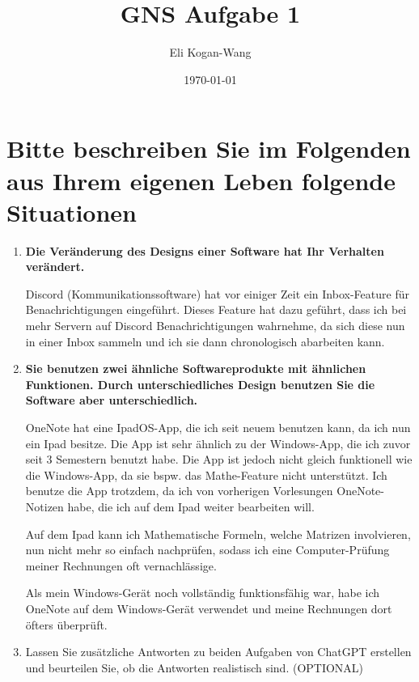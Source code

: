 \documentclass[a4paper,12pt]{article}
\title{GNS Aufgabe 1}
\author{Eli Kogan-Wang}
\date{\today}
\begin{document}

\section{Bitte beschreiben Sie im Folgenden aus Ihrem eigenen Leben folgende Situationen}
\begin{enumerate}[label=\alph*)]
  \item \textbf{Die Veränderung des Designs einer Software hat Ihr Verhalten verändert.}

        Discord (Kommunikationssoftware) hat vor einiger Zeit ein Inbox-Feature für
        Benachrichtigungen eingeführt. Dieses Feature hat dazu geführt, dass ich
        bei mehr Servern auf Discord Benachrichtigungen wahrnehme, da sich diese
        nun in einer Inbox sammeln und ich sie dann chronologisch abarbeiten kann.

  \item \textbf{Sie benutzen zwei ähnliche Softwareprodukte mit ähnlichen Funktionen. Durch
          unterschiedliches Design benutzen Sie die Software aber unterschiedlich.}

        OneNote hat eine IpadOS-App, die ich seit neuem benutzen kann, da ich
        nun ein Ipad besitze. Die App ist sehr ähnlich zu der Windows-App, die
        ich zuvor seit 3 Semestern benutzt habe. Die App ist jedoch nicht gleich
        funktionell wie die Windows-App, da sie bspw. das Mathe-Feature nicht
        unterstützt. Ich benutze die App trotzdem, da ich von vorherigen
        Vorlesungen OneNote-Notizen habe, die ich auf dem Ipad weiter bearbeiten
        will.

        Auf dem Ipad kann ich Mathematische Formeln, welche Matrizen involvieren,
        nun nicht mehr so einfach nachprüfen, sodass ich eine Computer-Prüfung meiner
        Rechnungen oft vernachlässige.

        Als mein Windows-Gerät noch vollständig funktionsfähig war, habe ich
        OneNote auf dem Windows-Gerät verwendet und meine Rechnungen dort
        öfters überprüft.

        \pagebreak

  \item Lassen Sie zusätzliche Antworten zu beiden Aufgaben von ChatGPT erstellen
        und beurteilen Sie, ob die Antworten realistisch sind. (OPTIONAL)


\end{enumerate}
\end{document}
